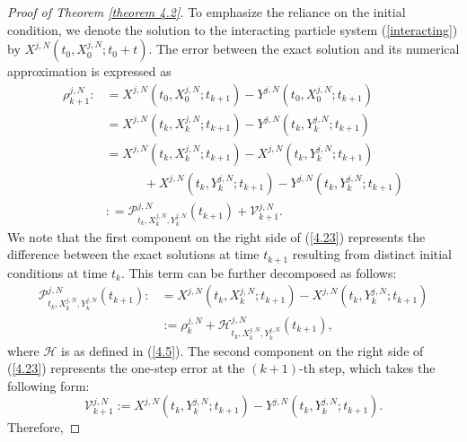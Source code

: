\documentclass[12pt]{article}
\numberwithin{equation}{section}
\begin{document}
\begin{proof}[ Proof of Theorem \ref{theorem 4.2}]
To emphasize the reliance on the initial condition, we denote the solution to the interacting particle system (\ref{interacting}) by $X^{j,N}\left(t_0, X^{j,N}_0 ; t_0+t\right)$. The error between the exact solution and its numerical approximation is expressed as 
\begin{equation}\tag{5.36}\label{4.23}
\begin{aligned}
\rho^{j,N}_{k+1}: & =X^{j,N}\left(t_0, X^{j,N}_0 ; t_{k+1}\right)-Y^{j,N}\left(t_0, X^{j,N}_0 ; t_{k+1}\right) \\
 &=X^{j,N}\left(t_k, X^{j,N}_k ; t_{k+1}\right)-Y^{j,N}\left(t_k, Y^{j,N}_k ; t_{k+1}\right) \\
 &=X^{j,N}\left(t_k, X^{j,N}_k ; t_{k+1}\right)-X^{j,N}\left(t_k, Y^{j,N}_k ; t_{k+1}\right)\\
&\qquad\quad +X^{j,N}\left(t_k, Y^{j,N}_k ; t_{k+1}\right)-Y^{j,N}\left(t_k, Y^{j,N}_k ; t_{k+1}\right) \\
&: =\mathcal{P}^{j,N}_{t_k, X^{j,N}_k, Y^{j,N}_k}\left(t_{k+1}\right)+\mathcal{V}^{j,N}_{k+1}.
\end{aligned}
\end{equation}
We note that the first component on the right side of (\ref{4.23}) represents the difference between the exact solutions  at time $t_{k+1}$ resulting from distinct initial conditions at time $t_k$. This term can be further decomposed as follows: 
\begin{equation}\tag{5.37}\label{4.24}
\begin{aligned}
\mathcal{P}^{j,N}_{t_k, X^{j,N}_k, Y^{j,N}_k}\left(t_{k+1}\right): & =X^{j,N}\left(t_k, X^{j,N}_k ; t_{k+1}\right)-X^{j,N}\left(t_k, Y^{j,N}_k ; t_{k+1}\right) \\
& :=\rho^{j,N}_k+\mathcal{H}^{j,N}_{t_k, X^{j,N}_k, Y^{j,N}_k}\left(t_{k+1}\right),
\end{aligned}
\end{equation}
where $\mathcal{H}$ is as defined in (\ref{4.5}).
The second component on the right side of (\ref{4.23}) represents the one-step error at the $\left(k+1\right)$-th step, which takes the following form: 
\begin{equation}\tag{5.38}\label{4.25}
\mathcal{V}^{j,N}_{k+1}:=X^{j,N}\left(t_k, Y^{j,N}_k ; t_{k+1}\right)-Y^{j,N}\left(t_k, Y^{j,N}_k ; t_{k+1}\right).
\end{equation}
Therefore, 

\end{proof}
\end{document}

